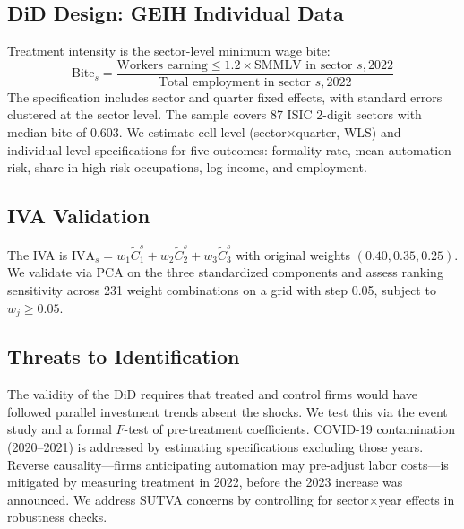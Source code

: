 \documentclass[a4paper,fleqn]{cas-sc}
\begin{document}
\subsection{DiD Design: GEIH Individual Data}
\label{subsec:did_geih}

Treatment intensity is the sector-level minimum wage bite:
\begin{equation}
\label{eq:mw_bite}
\text{Bite}_s = \frac{\text{Workers earning} \leq 1.2 \times \text{SMMLV in sector } s, 2022}{\text{Total employment in sector } s, 2022}
\end{equation}
The specification includes sector and quarter fixed effects, with standard errors clustered at the sector level. The sample covers 87 ISIC 2-digit sectors with median bite of 0.603. We estimate cell-level (sector$\times$quarter, WLS) and individual-level specifications for five outcomes: formality rate, mean automation risk, share in high-risk occupations, log income, and employment.

\subsection{IVA Validation}
\label{subsec:iva}

The IVA is $\text{IVA}_s = w_1 \tilde{C}_1^s + w_2 \tilde{C}_2^s + w_3 \tilde{C}_3^s$ with original weights $(0.40, 0.35, 0.25)$. We validate via PCA on the three standardized components and assess ranking sensitivity across 231 weight combinations on a grid with step 0.05, subject to $w_j \geq 0.05$.

\subsection{Threats to Identification}
\label{subsec:threats}

The validity of the DiD requires that treated and control firms would have followed parallel investment trends absent the shocks. We test this via the event study and a formal $F$-test of pre-treatment coefficients. COVID-19 contamination (2020--2021) is addressed by estimating specifications excluding those years. Reverse causality---firms anticipating automation may pre-adjust labor costs---is mitigated by measuring treatment in 2022, before the 2023 increase was announced. We address SUTVA concerns by controlling for sector$\times$year effects in robustness checks.

\FloatBarrier


\end{document}
